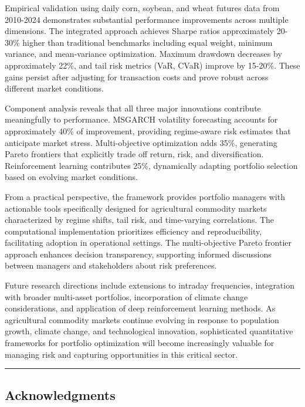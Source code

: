 \documentclass[
  10pt,
  a4paper,
]{article}
\begin{document}
\begin{tcolorbox}
Empirical validation using daily corn, soybean, and wheat futures data
from 2010-2024 demonstrates substantial performance improvements across
multiple dimensions. The integrated approach achieves Sharpe ratios
approximately 20-30\% higher than traditional benchmarks including equal
weight, minimum variance, and mean-variance optimization. Maximum
drawdown decreases by approximately 22\%, and tail risk metrics (VaR,
CVaR) improve by 15-20\%. These gains persist after adjusting for
transaction costs and prove robust across different market conditions.

Component analysis reveals that all three major innovations contribute
meaningfully to performance. MSGARCH volatility forecasting accounts for
approximately 40\% of improvement, providing regime-aware risk estimates
that anticipate market stress. Multi-objective optimization adds 35\%,
generating Pareto frontiers that explicitly trade off return, risk, and
diversification. Reinforcement learning contributes 25\%, dynamically
adapting portfolio selection based on evolving market conditions.

From a practical perspective, the framework provides portfolio managers
with actionable tools specifically designed for agricultural commodity
markets characterized by regime shifts, tail risk, and time-varying
correlations. The computational implementation prioritizes efficiency
and reproducibility, facilitating adoption in operational settings. The
multi-objective Pareto frontier approach enhances decision transparency,
supporting informed discussions between managers and stakeholders about
risk preferences.

Future research directions include extensions to intraday frequencies,
integration with broader multi-asset portfolios, incorporation of
climate change considerations, and application of deep reinforcement
learning methods. As agricultural commodity markets continue evolving in
response to population growth, climate change, and technological
innovation, sophisticated quantitative frameworks for portfolio
optimization will become increasingly valuable for managing risk and
capturing opportunities in this critical sector.

\begin{center}\rule{0.5\linewidth}{0.5pt}\end{center}

\subsection{Acknowledgments}\label{acknowledgments}


\end{tcolorbox}
\end{document}
